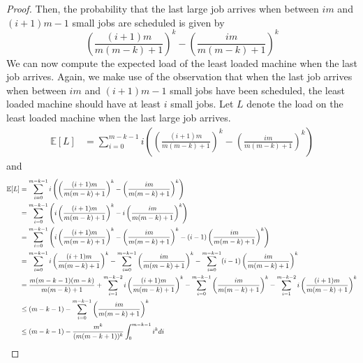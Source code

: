 \documentclass[11pt]{article}
\newcommand{\Exp}{\mathbb{E}}
\newcommand*{\Scale}[2][4]{\scalebox{#1}{$#2$}}
\begin{document}
\begin{enumerate}[leftmargin=16pt]
\begin{enumerate}[leftmargin=16pt]
\begin{proof}
            Then, the probability that the last large job arrives when between $im$ and $(i+1)m-1$ small jobs are scheduled is given by
            $$
            \left( \frac{(i+1)m}{m(m-k)+1} \right)^k - \left( \frac{im}{m(m-k)+1} \right)^k
            $$
            We can now compute the expected load of the least loaded machine when the last job arrives. Again, we make use of the observation that when the last job arrives when between $im$ and $(i+1)m-1$ small jobs have been scheduled, the least loaded machine should have at least $i$ small jobs. Let $L$ denote the load on the least loaded machine when the last large job arrives.
            \begin{equation} \label{eq:between-im-i-plus-m}
                \begin{aligned}
                    \Exp[L] &= \sum_{i=0}^{m-k-1} i \left( \left( \frac{(i+1)m}{m(m-k)+1} \right)^k - \left( \frac{im}{m(m-k)+1} \right)^k   \right) 
                \end{aligned}
            \end{equation}
            and
            $$
            \Scale[0.75]{
                \begin{aligned}
                    \Exp[L] &= \sum_{i=0}^{m-k-1} i \left( \left( \frac{(i+1)m}{m(m-k)+1} \right)^k - \left( \frac{im}{m(m-k)+1} \right)^k   \right) \\
                    &= \sum_{i=0}^{m-k-1} \left(  i\left( \frac{(i+1)m}{m(m-k)+1} \right)^k - i \left( \frac{im}{m(m-k)+1} \right)^k \right) \\
                    &= \sum_{i=0}^{m-k-1} \left(  i\left( \frac{(i+1)m}{m(m-k)+1} \right)^k - \left( \frac{im}{m(m-k)+1} \right)^k - (i-1) \left( \frac{im}{m(m-k)+1} \right)^k \right) \\
                    &= \sum_{i=0}^{m-k-1} i\left( \frac{(i+1)m}{m(m-k)+1} \right)^k - \sum_{i=0}^{m-k-1}\left( \frac{im}{m(m-k)+1} \right)^k - \sum_{i=0}^{m-k-1}(i-1) \left( \frac{im}{m(m-k)+1} \right)^k \\
                    &= \frac{m(m-k-1)(m-k)}{m(m-k)+1} + \sum_{i=1}^{m-k-2} i\left( \frac{(i+1)m}{m(m-k)+1} \right)^k - \sum_{i=0}^{m-k-1}\left( \frac{im}{m(m-k)+1} \right)^k - \sum_{i=1}^{m-k-2} i \left( \frac{(i+1)m}{m(m-k)+1} \right)^k \\
                    &\leq (m-k-1) - \sum_{i=0}^{m-k-1} \left( \frac{im}{m(m-k)+1} \right)^k \\
                    &\leq (m-k-1) - \frac{m^k}{(m(m-k+1))^{k}}\int_{0}^{m-k-1} i^k di \\

\end{aligned}}$$
\end{proof}
\end{enumerate}
\end{enumerate}
\end{document}
